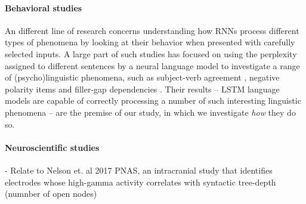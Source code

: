 \paragraph{Behavioral studies}
An different line of research concerns understanding how RNNs process different types of phenomena by looking at their behavior when presented with carefully selected inputs.
A large part of such studies has focused on using the perplexity assigned to different sentences by a neural language model to investigate a range of (psycho)linguistic phenomena, such as subject-verb agreement \cite{Linzen:etal:2016,Bernardy:Lappin:2017,Gulordava:etal:2018,Kuncoro:etal:2018a,Kuncoro:etal:2018b,Linzen:Leonard:2018}, negative polarity items \cite{marvin2018targeted,jumelet2018language} and filler-gap dependencies \cite{wilcox2018rnn}.
Their results -- LSTM language models are capable of correctly processing a number of such interesting linguistic phenomena -- are the premise of our study, in which we investigate \textit{how} they do so.

\paragraph{Neuroscientific studies}
- Relate to Nelson et. al 2017 PNAS, an intracranial study that identifies electrodes whose high-gamma activity correlates with syntactic tree-depth (numnber of open nodes)
